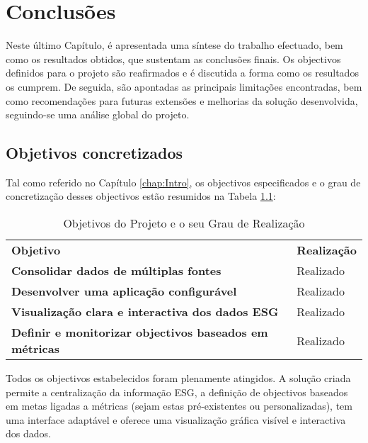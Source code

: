 \chapter{Conclusões} 
\label{chap:Conc}

Neste último Capítulo, é apresentada uma síntese do trabalho efectuado, bem como os resultados obtidos, que sustentam as conclusões finais. Os objectivos definidos para o projeto são reafirmados e é discutida a forma como os resultados os cumprem. De seguida, são apontadas as principais limitações encontradas, bem como recomendações para futuras extensões e melhorias da solução desenvolvida, seguindo-se uma análise global do projeto.

\section{Objetivos concretizados} 
\label{sec:ObjConc}

Tal como referido no Capítulo \ref{chap:Intro}, os objectivos especificados e o grau de concretização desses objectivos estão resumidos na Tabela \ref{tab:objective_done_table}:

\begin{table}[H]
    \renewcommand{\arraystretch}{1.2}
    \setlength{\tabcolsep}{10pt}
    \centering
    \begin{tabular}{>{\bfseries}p{11cm} p{4cm}}
        \rowcolor{purple!40}
        \textbf{Objetivo} & \textbf{Realização} \\
        \textbf{Consolidar dados de múltiplas fontes} & Realizado \\
        \textbf{Desenvolver uma aplicação configurável} & Realizado \\
        \textbf{Visualização clara e interactiva dos dados ESG} & Realizado \\
        \textbf{Definir e monitorizar objectivos baseados em métricas} & Realizado \\
    \end{tabular}
    \caption{Objetivos do Projeto e o seu Grau de Realização}
    \label{tab:objective_done_table}
\end{table}

Todos os objectivos estabelecidos foram plenamente atingidos. A solução criada permite a centralização da informação ESG, a definição de objectivos baseados em metas ligadas a métricas (sejam estas pré-existentes ou personalizadas), tem uma interface adaptável e oferece uma visualização gráfica visível e interactiva dos dados.

